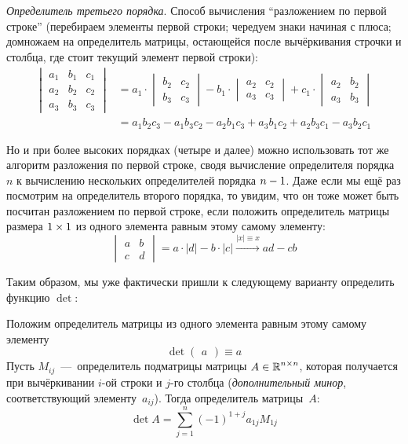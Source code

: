 \documentclass[a4paper,12pt]{article}
\theoremstyle{remark}
\begin{document}
  \emph{Определитель третьего порядка}.
  Способ вычисления ``разложением по первой строке'' (перебираем элементы первой строки; чередуем знаки начиная с плюса; домножаем на определитель матрицы, остающейся после вычёркивания строчки и столбца, где стоит текущий элемент первой строки):
  \begin{equation}
  \label{eq:third-order-det-fy-first-line}
  \begin{split}
    \begin{vmatrix}
      a_1 & b_1 & c_1\\
      a_2 & b_2 & c_2\\
      a_3 & b_3 & c_3
    \end{vmatrix} &=
      a_1 \cdot \begin{vmatrix}b_2 & c_2\\b_3 & c_3\end{vmatrix}
      - b_1 \cdot \begin{vmatrix}a_2 & c_2\\a_3 & c_3\end{vmatrix}
      + c_1 \cdot \begin{vmatrix}a_2 & b_2\\a_3 & b_3\end{vmatrix}\\
      &=a_1 b_2 c_3 - a_1 b_3 c_2 - a_2 b_1 c_3 + a_3 b_1 c_2 + a_2 b_3 c_1 - a_3 b_2 c_1
  \end{split}
  \end{equation}
  
  Но и при более высоких порядках (четыре и далее) можно использовать тот же алгоритм разложения по первой строке, сводя вычисление определителя порядка $n$ к вычислению нескольких определителей порядка $n \hm- 1$.
  Даже если мы ещё раз посмотрим на определитель второго порядка, то увидим, что он тоже может быть посчитан разложением по первой строке, если положить определитель матрицы размера $1 \hm\times 1$ из одного элемента равным этому самому элементу:
  \[
    \begin{vmatrix}
      a & b\\
      c & d
    \end{vmatrix}
    = a \cdot |d| - b \cdot |c|
    \xrightarrow{|x| \equiv x} ad - cb
  \]
  
  Таким образом, мы уже фактически пришли к следующему варианту определить функцию $\det$:
  
  \begin{definition}
    Положим определитель матрицы из одного элемента равным этому самому элементу
    \[
      \det \begin{pmatrix}a\end{pmatrix} \equiv a
    \]
    Пусть $M_{ij}$~---~определитель подматрицы матрицы $A \in \operatorname{\mathbb R}^{n \times n}$, которая получается при вычёркивании $i$-ой строки и $j$-го столбца (\emph{дополнительный минор}, соответствующий элементу~$a_{ij}$).
    Тогда определитель матрицы~$A$:
    \begin{equation}\label{eq:recursive-det}
      \det A = \sum\limits_{j = 1}^n (-1)^{1 + j} a_{1j} M_{1j}
    \end{equation}
  \end{definition}
  
\end{document}
